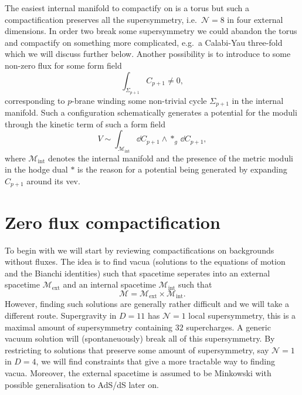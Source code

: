 The easiest internal manifold to compactify on is a torus but such a compactification preserves all the supersymmetry, i.e.\ $\mathcal{N}=8$ in four external dimensions. In order two break some supersymmetry we could abandon the torus and compactify on something more complicated, e.g.\ a Calabi-Yau three-fold which we will discuss further below. Another possibility is to introduce to some non-zero flux for some form field 
\begin{equation}
    \int_{\Sigma_{p+1}}C_{p+1}\neq 0,
\end{equation}
corresponding to $p$-brane winding some non-trivial cycle $\Sigma_{p+1}$ in the internal manifold. Such a configuration schematically generates a potential for the moduli through the kinetic term of such a form field 
\begin{equation}
    V\sim \int_{\mathcal{M}_{\text{int}}} \dd C_{p+1}\wedge *_{g}\,\dd C_{p+1}, 
\end{equation}
where $\mathcal{M}_\text{int}$ denotes the internal manifold and the presence of the metric moduli in the hodge dual $*$ is the reason for a potential being generated by expanding $C_{p+1}$ around its vev. 


\section{Zero flux compactification}
To begin with we will start by reviewing compactifications on backgrounds without fluxes. The idea is to find vacua (solutions to the equations of motion and the Bianchi identities) such that spacetime seperates into an external spacetime $\mathcal{M}_{\text{ext}}$ and an internal spacetime $\mathcal{M}_{\text{int}}$ such that 
\begin{equation}
    \mathcal{M} = \mathcal{M}_{\text{ext}}\times \mathcal{M}_{\text{int}}.
\end{equation}
However, finding such solutions are generally rather difficult and we will take a different route. Supergravity in $D=11$ has $\mathcal{N}=1$ local supersymmetry, this is a maximal amount of supersymmetry containing $32$ supercharges. A generic vacuum solution will (spontaneuously) break all of this supersymmetry. By restricting to solutions that preserve some amount of supersymmetry, say $\mathcal{N}=1$ in $D=4$, we will find constraints that give a more tractable way to finding vacua. Moreover, the external spacetime is assumed to be Minkowski with possible generalisation to AdS/dS later on. 

